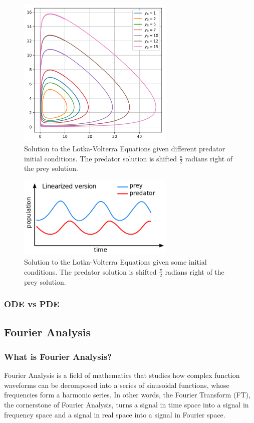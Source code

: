 \begin{figure}[H]
    \centering
    \includegraphics[width=75mm,height=\textheight,keepaspectratio]{images/Predator_prey_dynamics.png}
    \caption{Solution to the Lotka-Volterra Equations given different predator initial conditions. The predator solution is shifted $\frac{\pi}{2}$ radians right of the prey solution.}
    \label{fig:lotka_volterra_phase}
\end{figure}

\begin{figure}[H]
    \centering
    \includegraphics[width=75mm,height=\textheight,keepaspectratio]{images/Lotka_Volterra_dynamics.png}
    \caption{Solution to the Lotka-Volterra Equations given some initial conditions. The predator solution is shifted $\frac{\pi}{2}$ radians right of the prey solution.}
    \label{fig:lotka_volterra_init}
\end{figure}

\subsubsection{ODE vs PDE}

\subsection{Fourier Analysis}
\subsubsection{What is Fourier Analysis?}
Fourier Analysis is a field of mathematics that studies how complex function waveforms can be decomposed into a series of sinusoidal functions, whose frequencies form a harmonic series. In other words, the Fourier Transform (FT), the cornerstone of Fourier Analysis, turns a signal in time space into a signal in frequency space and a signal in real space into a signal in Fourier space.

